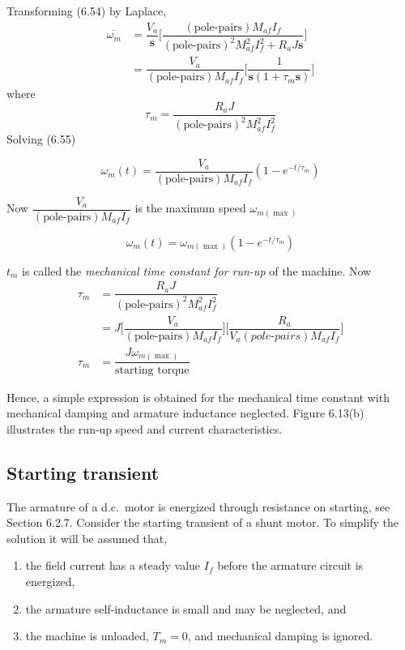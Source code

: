 \documentclass[a4paper,numbers=noenddot,12pt]{scrbook}
\begin{document}
Transforming (6.54) by Laplace,
\begin{align}
    \overline{\omega_m} & = \dfrac{V_a}{\mathbf{s}} \bigg[ \dfrac{(\text{pole-pairs}) M_{af} I_f}{{(\text{pole-pairs})}^2 M_{af}^2 I_f^2 + R_a J \mathbf{s}} \bigg] \nonumber \\
    & = \dfrac{V_a}{(\text{pole-pairs}) M_{af} I_f} \bigg[ \dfrac{1}{\mathbf{s}(1 + \tau_m \mathbf{s})}\bigg]
    \label{}
\end{align}
where
\begin{equation}
    \tau_m = \dfrac{R_a J}{{(\text{pole-pairs})}^2 M_{af}^2 I_f^2}
    \label{}
\end{equation}
Solving (6.55)

\begin{equation}
    \omega_m (t) = \dfrac{V_a}{(\text{pole-pairs}) M_{af} I_f} (1-e^{-t / \tau_m})
    \label{}
\end{equation}

Now $\dfrac{V_a}{(\text{pole-pairs}) M_{af} I_f}$ is the maximum speed $\omega_{m(\max)}$

\begin{equation}
    \omega_m(t) = \omega_{m(\max)} (1 - e^{-t / \tau_m})
    \label{}
\end{equation}

$t_m$ is called the \textit{mechanical time constant for run-up} of the machine.
Now
\begin{align}
    \tau_m & = \dfrac{R_a J}{{(\text{pole-pairs})}^2 M_{af}^2 I_f^2} \nonumber \\
    & = J \bigg[ \dfrac{V_a}{(\text{pole-pairs}) M_{af} I_f}\bigg] \bigg[\dfrac{R_a}{V_a (\textit{pole-pairs}) M_{af} I_f}\bigg] \nonumber \\
    \tau_m & = \dfrac{J \omega_{m(\max)}}{\text{starting torque}}
    \label{}
\end{align}

Hence, a simple expression is obtained for the mechanical time constant with mechanical damping and armature inductance neglected. Figure 6.13(b) illustrates the run-up speed and current characteristics.

\subsection{Starting transient}
The armature of a d.c.\ motor is energized through resistance on starting, see Section 6.2.7. Consider the starting transient of a shunt motor. To simplify the solution it will be assumed that,
\begin{enumerate}
    \item the field current has a steady value $I_f$ before the armature circuit is energized,
    \item the armature self-inductance is small and may be neglected, and
    \item the machine is unloaded, $T_m = 0$, and mechanical damping is ignored.
\end{enumerate}
\end{document}
